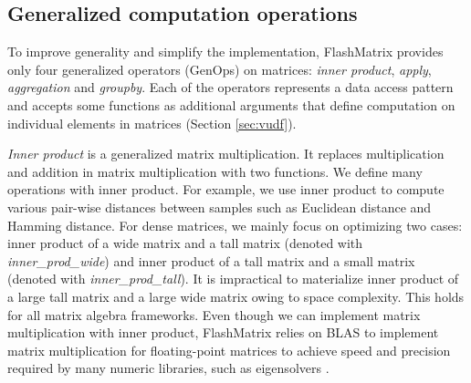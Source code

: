 


\subsection{Generalized computation operations} \label{sec:genop}
To improve generality and simplify the implementation, FlashMatrix provides
only four generalized operators (GenOps) on matrices: \textit{inner product},
\textit{apply}, \textit{aggregation} and \textit{groupby}. Each of the operators
represents a data access pattern and accepts some functions as additional
arguments that define computation
on individual elements in matrices (Section \ref{sec:vudf}).

\textit{Inner product} is a generalized matrix multiplication. It replaces
multiplication and addition in matrix multiplication with two functions.
We define many operations
with inner product. For example, we use inner product to compute various
pair-wise distances between samples such as Euclidean distance and
Hamming distance. For dense matrices, we mainly focus on
optimizing two cases: inner product of a wide matrix and a tall matrix (denoted
with \textit{inner\_prod\_wide}) and inner product of a tall matrix and a small
matrix (denoted with \textit{inner\_prod\_tall}). It is impractical to
materialize inner product of a large tall matrix and a large wide matrix owing
to space complexity. This holds for all matrix algebra frameworks.
Even though we can implement matrix multiplication with inner product,
FlashMatrix relies on BLAS to implement matrix multiplication for
floating-point matrices to achieve speed and precision required by
many numeric libraries, such as eigensolvers \cite{anasazi, FlashEigen}.

